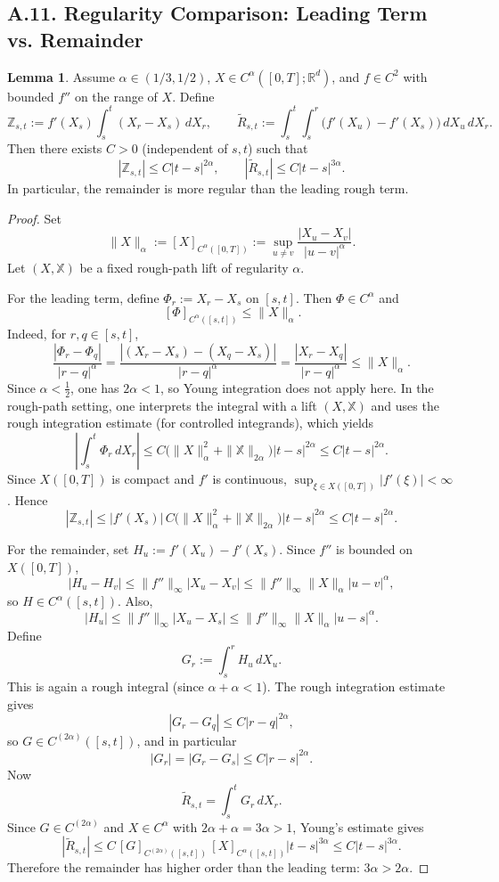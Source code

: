 \documentclass[11pt]{article}
\theoremstyle{definition}
\newtheorem{lemma}{Lemma}
\theoremstyle{remark}
\begin{document}
\subsection*{A.11. Regularity Comparison: Leading Term vs. Remainder}
\begin{lemma}
Assume $\alpha\in(1/3,1/2)$, $X\in C^\alpha([0,T];\mathbb R^d)$, and $f\in C^2$ with bounded $f''$ on the range of $X$. Define
\[
\mathbb Z_{s,t}:=f'(X_s)\int_s^t (X_r-X_s)\,dX_r,
\qquad
\widetilde R_{s,t}
:=
\int_s^t\int_s^r \bigl(f'(X_u)-f'(X_s)\bigr)\,dX_u\,dX_r.
\]
Then there exists $C>0$ (independent of $s,t$) such that
\[
|\mathbb Z_{s,t}|\le C|t-s|^{2\alpha},
\qquad
|\widetilde R_{s,t}|\le C|t-s|^{3\alpha}.
\]
In particular, the remainder is more regular than the leading rough term.
\end{lemma}
\begin{proof}
Set
\[
\|X\|_\alpha:=[X]_{C^\alpha([0,T])}
:=
\sup_{u\ne v}\frac{|X_u-X_v|}{|u-v|^\alpha}.
\]
Let $(X,\mathbb X)$ be a fixed rough-path lift of regularity $\alpha$.

For the leading term, define $\Phi_r:=X_r-X_s$ on $[s,t]$. Then $\Phi\in C^\alpha$ and
\[
\,[\Phi]_{C^\alpha([s,t])}\le \|X\|_\alpha.
\]
Indeed, for $r,q\in[s,t]$,
\[
\frac{|\Phi_r-\Phi_q|}{|r-q|^\alpha}
=
\frac{|(X_r-X_s)-(X_q-X_s)|}{|r-q|^\alpha}
=
\frac{|X_r-X_q|}{|r-q|^\alpha}
\le
\|X\|_\alpha.
\]
Since $\alpha<\frac12$, one has $2\alpha<1$, so Young integration does not apply here. In the rough-path setting, one interprets the integral with a lift $(X,\mathbb X)$ and uses the rough integration estimate (for controlled integrands), which yields
\[
\left|\int_s^t \Phi_r\,dX_r\right|
\le
C\bigl(\|X\|_\alpha^2+\|\mathbb X\|_{2\alpha}\bigr)|t-s|^{2\alpha}
\le
C|t-s|^{2\alpha}.
\]
Since $X([0,T])$ is compact and $f'$ is continuous, $\sup_{\xi\in X([0,T])}|f'(\xi)|<\infty$.
Hence
\[
|\mathbb Z_{s,t}|
\le
|f'(X_s)|\,C\bigl(\|X\|_\alpha^2+\|\mathbb X\|_{2\alpha}\bigr)|t-s|^{2\alpha}
\le
C|t-s|^{2\alpha}.
\]

For the remainder, set $H_u:=f'(X_u)-f'(X_s)$. Since $f''$ is bounded on $X([0,T])$,
\[
|H_u-H_v|
\le
\|f''\|_\infty |X_u-X_v|
\le
\|f''\|_\infty \|X\|_\alpha |u-v|^\alpha,
\]
so $H\in C^\alpha([s,t])$. Also,
\[
|H_u|
\le
\|f''\|_\infty |X_u-X_s|
\le
\|f''\|_\infty \|X\|_\alpha |u-s|^\alpha.
\]
Define
\[
G_r:=\int_s^r H_u\,dX_u.
\]
This is again a rough integral (since $\alpha+\alpha<1$). The rough integration estimate gives
\[
|G_r-G_q|
\le
C|r-q|^{2\alpha},
\]
so $G\in C^{(2\alpha)}([s,t])$, and in particular
\[
|G_r|=|G_r-G_s|\le C|r-s|^{2\alpha}.
\]
Now
\[
\widetilde R_{s,t}=\int_s^t G_r\,dX_r.
\]
Since $G\in C^{(2\alpha)}$ and $X\in C^\alpha$ with $2\alpha+\alpha=3\alpha>1$, Young's estimate gives
\[
|\widetilde R_{s,t}|
\le
C\,[G]_{C^{(2\alpha)}([s,t])}\,[X]_{C^\alpha([s,t])}|t-s|^{3\alpha}
\le
C|t-s|^{3\alpha}.
\]
Therefore the remainder has higher order than the leading term: $3\alpha>2\alpha$.
\end{proof}
\end{document}

